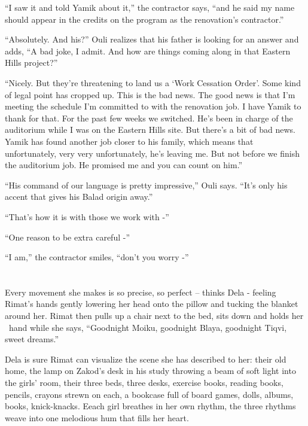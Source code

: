 \documentclass[twoside,11pt]{book}
\begin{document}
``I saw it and told Yamik about it,'' the contractor says, ``and he said my name
should appear in the credits on the program as the renovation's contractor.''

``Absolutely. And his?'' Ouli realizes that his father is looking for an answer and adds,
``A bad joke, I admit. And how are things coming along in that Eastern Hills project?''

``Nicely. But they're threatening to land us a `Work Cessation Order'. Some kind of legal point has cropped
up. This is the bad news. The good news is that I'm meeting the schedule I'm committed to with the renovation job. I
have Yamik to thank for that. For the past few weeks we switched. He's been in charge of the auditorium while I was on
the Eastern Hills site. But there's a bit of bad news. Yamik has found another job closer to his family, which means
that unfortunately, very very unfortunately, he's leaving me. But not before we finish the auditorium job. He promised
me and you can count on him.''

``His command of our language is pretty impressive,'' Ouli says. ``It's only his
accent that gives his Balad origin away.''

``That's how it is with those we work with -''

``One reason to be extra careful -''

``I am,'' the contractor smiles, ``don't you worry -''



\chapter{}

Every movement she makes is so precise, so perfect -- thinks Dela - feeling Rimat's hands gently lowering her head onto
the pillow and tucking the blanket around her. Rimat then pulls up a chair next to the bed, sits down and holds her
\ hand while she says, ``Goodnight Moiku,  goodnight Blaya, goodnight Tiqvi, sweet dreams.''

Dela is sure Rimat can visualize the scene she has described to her: their old home, the lamp on Zakod's desk in his
study throwing a beam of soft light into the girls' room, their three beds, three desks, exercise books, reading
books, pencils, crayons strewn on each, a bookcase full of board games, dolls, albums, books, knick-knacks. Eeach girl
breathes in her own rhythm, the three rhythms weave into one melodious hum that fills her heart.
\end{document}
